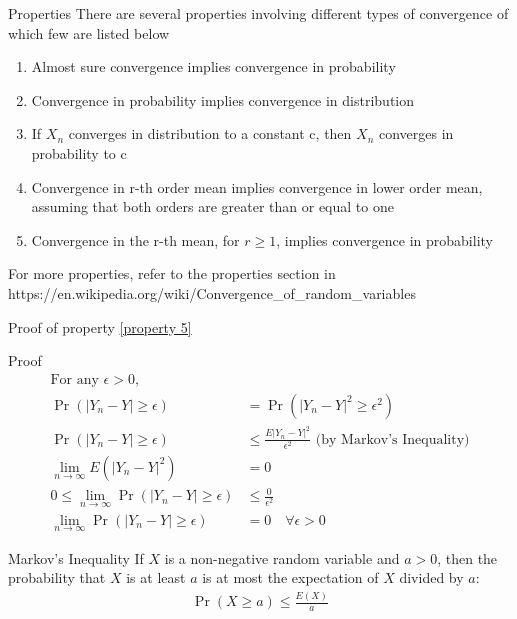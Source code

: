 \documentclass{beamer}
\providecommand{\abs}[1]{\vert#1\vert}
\begin{document}
\begin{frame}{Properties}
There are several properties involving different types of convergence of which few are listed below
\begin{enumerate}
    \item Almost sure convergence implies convergence in probability
    \item Convergence in probability implies convergence in distribution
    \item If $X_n$ converges in distribution to a constant c, then $X_n$ converges in probability to c
    \item Convergence in r-th order mean implies convergence in lower order mean, assuming that both orders are greater than or equal to one
    \item Convergence in the r-th mean, for $r\geq1$, implies convergence in probability \label{property 5}
\end{enumerate}
For more properties, refer to the properties section in https://en.wikipedia.org/wiki/Convergence\_of\_random\_variables
\end{frame}

\begin{frame}{Proof of property \eqref{property 5}}
\begin{block}{Proof}
\begin{align}
    \text{For any }\epsilon > 0, \quad &
    \\\Pr{(\abs{Y_n-Y}\geq \epsilon)} &= \Pr{(\abs{Y_n-Y}^2\geq \epsilon^2)}
    \\\Pr{(\abs{Y_n-Y}\geq \epsilon)}  &\leq \frac{E\abs{Y_n-Y}^2}{\epsilon^2} 
    \text{ (by Markov's Inequality)}
    \\\lim_{n\rightarrow \infty} E(\abs{Y_n-Y}^2) &= 0 
    \\0 \leq  \lim_{n\rightarrow \infty}\Pr{(\abs{Y_n-Y}\geq \epsilon)}  &\leq \frac{0}{\epsilon^2}
    \\   \lim_{n\rightarrow \infty}\Pr{(\abs{Y_n-Y}\geq \epsilon)} &= 0 \quad \forall \epsilon >0
\end{align}
\end{block}
\end{frame}
\begin{frame}{Markov's Inequality}
If $X$ is a non-negative random variable and $a>0$, then the probability that $X$ is at least $a$ is at most the expectation of $X$ divided by $a$:
\begin{align}
    \Pr{(X\geq a)} \leq \frac{E(X)}{a}
\end{align}
    
\end{frame}
\end{document}
